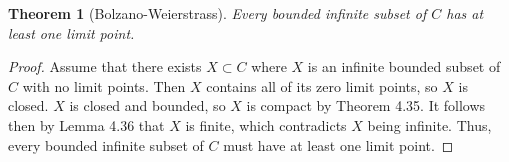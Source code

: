 \documentclass[12pt]{article}
\renewcommand{\_}[1]{\underline{ #1 }}
\newtheorem{theorem}{Theorem}[section]
\theoremstyle{definition}
\numberwithin{equation}{subsection}
\begin{document}
\begin{theorem}[Bolzano-Weierstrass]  Every bounded infinite subset of $C$ has at least one limit point.
\end{theorem}

\begin{proof}
Assume that there exists $X \subset C$ where $X$ is an infinite bounded subset of $C$ with no limit points. Then $X$ contains all of its zero limit points, so $X$ is closed. $X$ is closed and bounded, so $X$ is compact by Theorem 4.35. It follows then by Lemma 4.36 that $X$ is finite, which contradicts $X$ being infinite. Thus, every bounded infinite subset of $C$ must have at least one limit point.
\end{proof}
\end{document}
